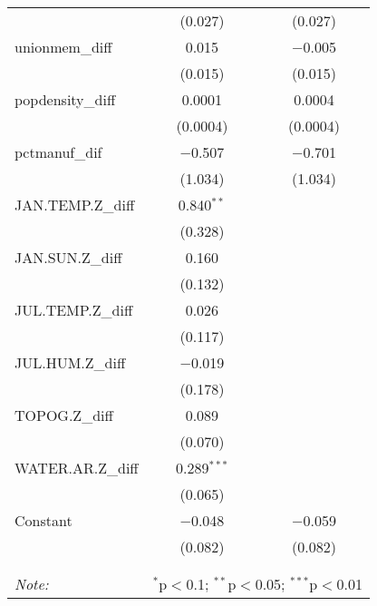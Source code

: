 \begin{table}[!htbp]
\begin{tabular}{@{\extracolsep{5pt}}lcc}
  & (0.027) & (0.027) \\ 
  unionmem\_diff & 0.015 & $-$0.005 \\ 
  & (0.015) & (0.015) \\ 
  popdensity\_diff & 0.0001 & 0.0004 \\ 
  & (0.0004) & (0.0004) \\ 
  pctmanuf\_dif & $-$0.507 & $-$0.701 \\ 
  & (1.034) & (1.034) \\ 
  JAN.TEMP.Z\_diff & 0.840$^{**}$ &  \\ 
  & (0.328) &  \\ 
  JAN.SUN.Z\_diff & 0.160 &  \\ 
  & (0.132) &  \\ 
  JUL.TEMP.Z\_diff & 0.026 &  \\ 
  & (0.117) &  \\ 
  JUL.HUM.Z\_diff & $-$0.019 &  \\ 
  & (0.178) &  \\ 
  TOPOG.Z\_diff & 0.089 &  \\ 
  & (0.070) &  \\ 
  WATER.AR.Z\_diff & 0.289$^{***}$ &  \\ 
  & (0.065) &  \\ 
  Constant & $-$0.048 & $-$0.059 \\ 
  & (0.082) & (0.082) \\ 
 \hline \\[-1.8ex] 
\hline 
\hline \\[-1.8ex] 
\textit{Note:}  & \multicolumn{2}{r}{$^{*}$p$<$0.1; $^{**}$p$<$0.05; $^{***}$p$<$0.01} \\ 
\end{tabular} 
\end{table} 
